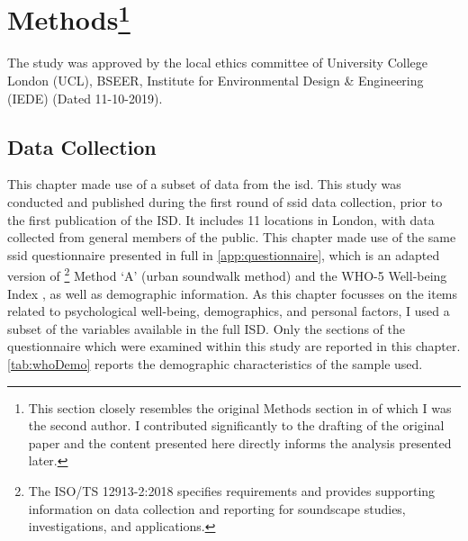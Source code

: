

\section[Methods]{Methods\footnote{This section closely resembles the original Methods section in \citep{Erfanian2021Psychological} of which I was the second author. I contributed significantly to the drafting of the original paper and the content presented here directly informs the analysis presented later.}}

The study was approved by the local ethics committee of University College London (UCL), BSEER, Institute for Environmental Design \& Engineering (IEDE) (Dated 11-10-2019).

\subsection{Data Collection}
This chapter made use of a subset of data from the \gls{isd}. This study was conducted and published during the first round of \gls{ssid} data collection, prior to the first publication of the ISD. It includes 11 locations in London, with data collected from general members of the public. This chapter made use of the same \gls{ssid} questionnaire presented in full in \cref{app:questionnaire}, which is an adapted version of \citet{ISO12913Part2}\footnote{The ISO/TS 12913-2:2018 specifies requirements and provides supporting information on data collection and reporting for soundscape studies, investigations, and applications.} Method `A' (urban soundwalk method) and the WHO-5 Well-being Index \citep{Hall2011Examining}, as well as demographic information. As this chapter focusses on the items related to psychological well-being, demographics, and personal factors, I used a subset of the variables available in the full ISD. Only the sections of the questionnaire which were examined within this study are reported in this chapter. \cref{tab:whoDemo} reports the demographic characteristics of the sample used.


